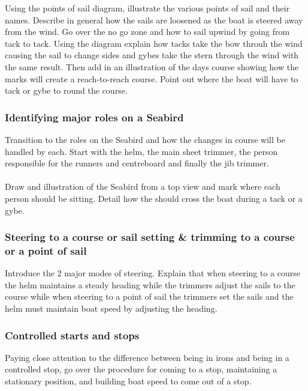 \documentclass[12pt]{scrartcl}
\begin{document}
Using the points of sail diagram, illustrate the various points of sail and their names. Describe in general how the sails are loosened as the boat is steered away from the wind. Go over the no go zone and how to sail upwind by going from tack to tack. Using the diagram explain how tacks take the bow throuh the wind causing the sail to change sides and gybes take the stern through the wind with the same result. Then add in an illustration of the days course showing how the marks will create a reach-to-reach course. Point out where the boat will have to tack or gybe to round the course.

\subsubsection{Identifying major roles on a Seabird} \label{subsubsec:major-roles}

Transition to the roles on the Seabird and how the changes in course will be handled by each. Start with the helm, the main sheet trimmer, the person responsible for the runners and centreboard and finally the jib trimmer.
\\
\\
Draw and illustration of the Seabird from a top view and mark where each person should be sitting. Detail how the should cross the boat during a tack or a gybe.

\subsubsection{Steering to a course or sail setting \& trimming to a course or a point of sail} \label{subsubsec:steering-trimming}

Introduce the 2 major modes of steering. Explain that when steering to a course the helm maintains a steady heading while the trimmers adjust the sails to the course while when steering to a point of sail the trimmers set the sails and the helm must maintain boat speed by adjusting the heading.

\subsubsection{Controlled starts and stops} \label{subsubsec:starts-stops}

Paying close attention to the difference between being in irons and being in a controlled stop, go over the procedure for coming to a stop, maintaining a stationary position, and building boat speed to come out of a stop.
\end{document}
